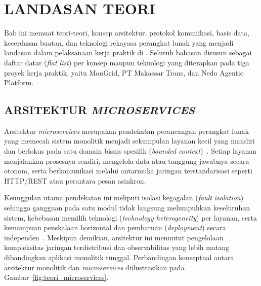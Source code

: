\chapter{LANDASAN TEORI}

Bab ini memuat teori-teori, konsep arsitektur, protokol komunikasi, basis data, kecerdasan buatan, dan teknologi rekayasa perangkat lunak yang menjadi landasan dalam pelaksanaan kerja praktik di \NamaPerusahaan. Seluruh bahasan disusun sebagai daftar datar (\textit{flat list}) per konsep maupun teknologi yang diterapkan pada tiga proyek kerja praktik, yaitu MonGrid, PT Makassar Trans, dan Nedo Agentic Platform.

\section{ARSITEKTUR \textit{MICROSERVICES}}

Arsitektur \textit{microservices} merupakan pendekatan perancangan perangkat lunak yang memecah sistem monolitik menjadi sekumpulan layanan kecil yang mandiri dan berfokus pada satu domain bisnis spesifik (\textit{bounded context})~\cite{newman2021building}. Setiap layanan menjalankan prosesnya sendiri, mengelola data atau tanggung jawabnya secara otonom, serta berkomunikasi melalui antarmuka jaringan terstandarisasi seperti HTTP/REST atau perantara pesan asinkron.

Keunggulan utama pendekatan ini meliputi isolasi kegagalan (\textit{fault isolation}) sehingga gangguan pada satu modul tidak langsung melumpuhkan keseluruhan sistem, kebebasan memilih teknologi (\textit{technology heterogeneity}) per layanan, serta kemampuan penskalaan horizontal dan pembaruan (\textit{deployment}) secara independen~\cite{newman2021building}. Meskipun demikian, arsitektur ini menuntut pengelolaan kompleksitas jaringan terdistribusi dan observabilitas yang lebih matang dibandingkan aplikasi monolitik tunggal. Perbandingan konseptual antara arsitektur monolitik dan \textit{microservices} diilustrasikan pada Gambar~\ref{fig:teori_microservices}.

